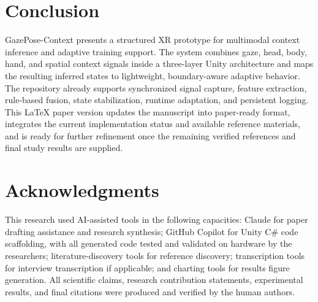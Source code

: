 \documentclass[10pt,twocolumn]{article}
\begin{document}
\section{Conclusion}
GazePose-Context presents a structured XR prototype for multimodal context inference and adaptive training support. The system combines gaze, head, body, hand, and spatial context signals inside a three-layer Unity architecture and maps the resulting inferred states to lightweight, boundary-aware adaptive behavior. The repository already supports synchronized signal capture, feature extraction, rule-based fusion, state stabilization, runtime adaptation, and persistent logging. This LaTeX paper version updates the manuscript into paper-ready format, integrates the current implementation status and available reference materials, and is ready for further refinement once the remaining verified references and final study results are supplied.

\section*{Acknowledgments}
This research used AI-assisted tools in the following capacities: Claude for paper drafting assistance and research synthesis; GitHub Copilot for Unity C\# code scaffolding, with all generated code tested and validated on hardware by the researchers; literature-discovery tools for reference discovery; transcription tools for interview transcription if applicable; and charting tools for results figure generation. All scientific claims, research contribution statements, experimental results, and final citations were produced and verified by the human authors.
\end{document}
